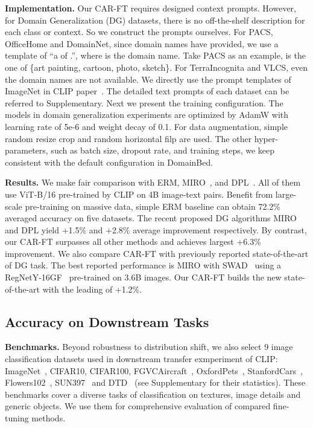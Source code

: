 \documentclass[pdflatex,sn-basic,iicol]{sn-jnl}
\theoremstyle{thmstyleone}\newtheorem{theorem}{Theorem}\newtheorem{proposition}[theorem]{Proposition}
\theoremstyle{thmstyletwo}\newtheorem{example}{Example}\newtheorem{remark}{Remark}
\theoremstyle{thmstylethree}\newtheorem{definition}{Definition}
\begin{document}
\noindent\textbf{Implementation. } Our CAR-FT requires designed context prompts. However, for Domain Generalization (DG) datasets, there is no off-the-shelf description for each class or context. So we construct the prompts ourselves. For PACS, OfficeHome and DomainNet, since domain names have provided, we use a template of ``a  of .'', where  is the domain name. Take PACS as an example,  is the one of \{art painting, cartoon, photo, sketch\}. For TerraIncognita and VLCS, even the domain names are not available. We directly use the prompt templates of ImageNet in CLIP paper~\citep{radford2021learning}. The detailed text prompts of each dataset can be referred to Supplementary. Next we present the training configuration. The models in domain generalization experiments are optimized by AdamW with learning rate of 5e-6 and weight decay of 0.1. For data augmentation, simple random resize crop and random horizontal filp are used. The other hyper-parameters, such as batch size, dropout rate, and training steps, we keep consistent with the default configuration in DomainBed. 

\noindent\textbf{Results.} We make fair comparison with ERM, MIRO~\citep{cha2022domain}, and DPL~\citep{zhang2022domain}. All of them use ViT-B/16 pre-trained by CLIP on 4B image-text pairs. Benefit from large-scale pre-training on massive data, simple ERM baseline can obtain 72.2\% averaged accuracy on five datasets. The recent proposed DG algorithms MIRO and DPL yield +1.5\% and +2.8\% average improvement respectively. By contrast, our CAR-FT surpasses all other methods and achieves largest +6.3\% improvement. We also compare CAR-FT with previously reported state-of-the-art of DG task. The best reported performance is MIRO with SWAD~\citep{cha2021swad} using a RegNetY-16GF~\citep{radosavovic2020designing} pre-trained on 3.6B images. Our CAR-FT builds the new state-of-the-art with the leading of +1.2\%. 

\subsection{Accuracy on Downstream Tasks} \label{sec:transfer}

\noindent\textbf{Benchmarks.} Beyond robustness to distribution shift, we also select 9 image classification datasets used in downstream transfer exmperiment of CLIP: ImageNet~\citep{deng2009imagenet}, CIFAR10, CIFAR100, FGVCAircraft~\citep{maji2013fine}, OxfordPets~\citep{parkhi2012cats}, StanfordCars~\citep{krause20133d}, Flowers102~\citep{nilsback2008automated}, SUN397~\citep{xiao2016sun} and DTD~\citep{cimpoi2014describing} (see Supplementary for their statistics). These benchmarks cover a diverse tasks of classification on textures, image details and generic objects. We use them for comprehensive evaluation of compared fine-tuning methods. 
\end{document}
